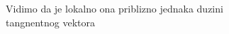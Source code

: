 \documentclass[preview]{standalone}
\begin{document}
\begin{center}
Vidimo da je lokalno ona priblizno jednaka duzini\\ tangnentnog vektora
\end{center}
\end{document}
